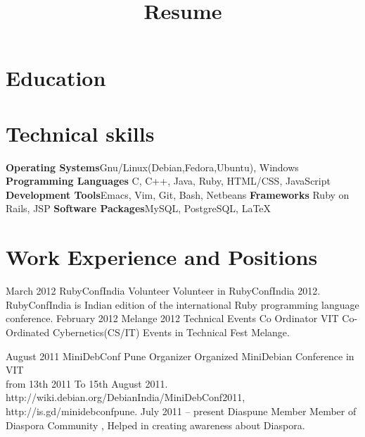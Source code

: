 \documentclass[11pt,a4paper]{moderncv}
\title{Resume}
\begin{document}
\maketitle

\section{Education}

\section{Technical skills}
\cvcomputer
{\textbf{Operating Systems}}{Gnu/Linux(Debian,Fedora,Ubuntu), Windows}
{\textbf{Programming Languages}}{ C, C++, Java, Ruby, HTML/CSS, JavaScript }
\cvcomputer
{\textbf{Development Tools}}{Emacs, Vim, Git, Bash, Netbeans}
{\textbf{Frameworks}}{ Ruby on Rails, JSP}
\cvcomputer
{\textbf{Software Packages}}{MySQL, PostgreSQL, LaTeX}
{}{}


\section{Work Experience and Positions}

\cventry    
            {March 2012}
            {RubyConfIndia}
            {Volunteer}
            {}
            {}
            {
              Volunteer in RubyConfIndia 2012. \\ 
              RubyConfIndia is Indian edition of the international
              Ruby programming language conference. 
            }
\cventry
            {February 2012}
            {Melange 2012 Technical Events }
            {Co Ordinator}
            {VIT}
            {}
            {
             Co-Ordinated Cybernetics(CS/IT) Events in Technical Fest
             Melange.
            } 

\cventry
            {August 2011}
            {MiniDebConf Pune}
            {Organizer}
            {}
            {}
            {
             Organized MiniDebian Conference in VIT \\
             from 13th 2011 To 15th August 2011.    \\
             http://wiki.debian.org/DebianIndia/MiniDebConf2011, \\
             http://is.gd/minidebconfpune.
           }
\cventry
           {July 2011 -- present}
           {Diaspune}
           {Member}
           {}
           {}
           {
            Member of Diaspora Community , Helped in creating
            awareness about Diaspora. 
           }
\end{document}
